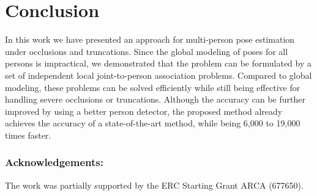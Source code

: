 \documentclass[runningheads]{llncs}
\begin{document}
\section{Conclusion}
In this work we have presented an approach for multi-person pose estimation under occlusions and truncations. Since the global modeling of poses for all persons is impractical, we demonstrated that the problem can be formulated by a set of independent local joint-to-person association problems. Compared to global modeling, these problems can be solved efficiently while still being effective for handling severe occlusions or truncations. Although the accuracy can be further improved by using a better person detector, the proposed method already achieves the accuracy of a state-of-the-art method, while being 6,000 to 19,000 times faster. 

\subsubsection*{Acknowledgements:}
The work was partially supported by the ERC Starting Grant ARCA (677650).



\end{document}
